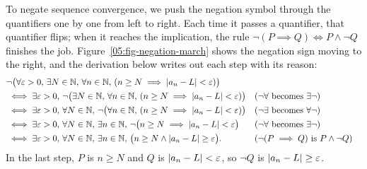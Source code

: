 To negate sequence convergence, we push the negation symbol through the quantifiers one by one from left to right. Each time it passes a quantifier, that quantifier flips; when it reaches the implication, the rule $\neg(P \implies Q) \iff P \land \neg Q$ finishes the job. Figure~\ref{05:fig-negation-march} shows the negation sign moving to the right, and the derivation below writes out each step with its reason:
\begin{align*}
&\neg \bigl(\forall \varepsilon > 0, \, \exists N \in \mathbb{N}, \, \forall n \in \mathbb{N}, \, (n \ge N \implies |a_n - L| < \varepsilon)\bigr) \\
&\iff \exists \varepsilon > 0, \, \neg \bigl(\exists N \in \mathbb{N}, \, \forall n \in \mathbb{N}, \, (n \ge N \implies |a_n - L| < \varepsilon)\bigr) && \text{($\neg\forall$ becomes $\exists\neg$)} \\
&\iff \exists \varepsilon > 0, \, \forall N \in \mathbb{N}, \, \neg \bigl(\forall n \in \mathbb{N}, \, (n \ge N \implies |a_n - L| < \varepsilon)\bigr) && \text{($\neg\exists$ becomes $\forall\neg$)} \\
&\iff \exists \varepsilon > 0, \, \forall N \in \mathbb{N}, \, \exists n \in \mathbb{N}, \, \neg \bigl(n \ge N \implies |a_n - L| < \varepsilon\bigr) && \text{($\neg\forall$ becomes $\exists\neg$)} \\
&\iff \exists \varepsilon > 0, \, \forall N \in \mathbb{N}, \, \exists n \in \mathbb{N}, \, \bigl(n \ge N \land |a_n - L| \ge \varepsilon\bigr). && \text{($\neg(P \implies Q)$ is $P \land \neg Q$)}
\end{align*}
In the last step, $P$ is $n \ge N$ and $Q$ is $|a_n - L| < \varepsilon$, so $\neg Q$ is $|a_n - L| \ge \varepsilon$.


